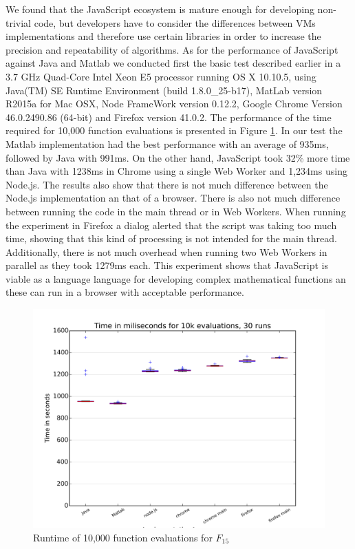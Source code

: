 \documentclass[journal,onecolumn]{IEEEtran}
\begin{document}
We found that the JavaScript ecosystem is mature enough for developing non-trivial 
code, but developers have to consider the differences between VMs implementations
and therefore use certain libraries in order to increase the precision and repeatability of
algorithms. As for the performance of JavaScript against Java and Matlab
we conducted first the basic test described earlier in a 3.7 GHz Quad-Core
Intel Xeon E5 processor running OS X 10.10.5, 
using Java(TM) SE Runtime Environment (build 1.8.0\_25-b17), 
MatLab version R2015a for Mac OSX, Node FrameWork version 0.12.2,
Google Chrome Version 46.0.2490.86 (64-bit) 
and Firefox version 41.0.2. %
 The performance of the time required for 10,000 function evaluations is presented in
Figure \ref{fig:f15_times}. In our test the Matlab implementation had the best
performance with an average of 935ms, followed by Java with
991ms. On the other hand, JavaScript took 32\% more time than Java with 1238ms in Chrome using a 
single Web Worker and 1,234ms using Node.js. %
The results also show that there is not much difference between the Node.js
implementation an that of a
browser. There is also not much difference between running the code in the main thread or in Web
Workers. When running the experiment in Firefox a dialog alerted that the
script was taking too much time, showing that this
kind of processing is not intended for the main thread. Additionally, there is not much overhead
when running two
Web Workers in parallel as they took 1279ms each. This experiment
shows that JavaScript is viable as a language
language for developing complex mathematical functions an these can run in a browser
with acceptable performance. 
\begin{figure}[!htb]
\centering
\includegraphics[width=0.9\linewidth]{f15_times.png}
\caption{ Runtime of 10,000 function evaluations for $F_{15}$} 
\label{fig:f15_times}
\end{figure}
\end{document}
